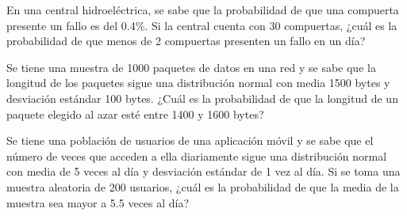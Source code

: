 \begin{Quest}
En una central hidroeléctrica, se sabe que la probabilidad de que una compuerta presente un fallo es del 0.4\%. Si la central cuenta con 30 compuertas, ¿cuál es la probabilidad de que menos de 2 compuertas presenten un fallo en un día?
\end{Quest}


\begin{Quest}
Se tiene una muestra de 1000 paquetes de datos en una red y se sabe que la longitud de los paquetes sigue una distribución normal con media 1500 bytes y desviación estándar 100 bytes. ¿Cuál es la probabilidad de que la longitud de un paquete elegido al azar esté entre 1400 y 1600 bytes?
\end{Quest}


\begin{Quest}
Se tiene una población de usuarios de una aplicación móvil y se sabe que el número de veces que acceden a ella diariamente sigue una distribución normal con media de 5 veces al día y desviación estándar de 1 vez al día. Si se toma una muestra aleatoria de 200 usuarios, ¿cuál es la probabilidad de que la media de la muestra sea mayor a 5.5 veces al día?
\end{Quest}

\newpage
